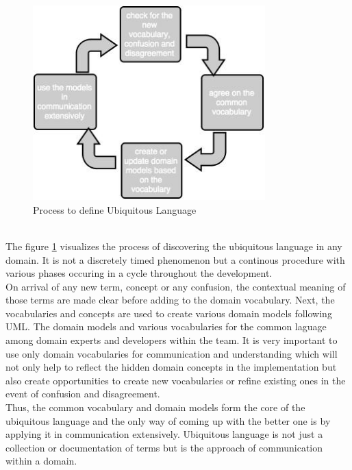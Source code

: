 \begin{figure}[H]
\begin{center}
\includegraphics[width=0.8\textwidth]{figures/domain_driven_design_one}
\caption{Process to define Ubiquitous Language \cite{Evans:2003aa}}
\label{fig:domain_driven_design/ubiquitous_language_process}
\end{center}
\end{figure}
\\
The figure \ref{fig:domain_driven_design/ubiquitous_language_process} visualizes the process of discovering the ubiquitous language in any domain. It is not a discretely timed phenomenon but a continous procedure with various phases occuring in a cycle throughout the development.
\\
On arrival of any new term, concept or any confusion, the contextual meaning of those terms are made clear before adding to the domain vocabulary. Next, the vocabularies and concepts are used to create various domain models following \acrshort{UML}. The domain models and various vocabularies for the common laguage among domain experts and developers within the team. It is very important to use only domain vocabularies for communication and understanding which will not only help to reflect the hidden domain concepts in the implementation but also create opportunities to create new vocabularies or refine existing ones in the event of confusion and disagreement.\cite{Evans:2003aa}
\\
Thus, the common vocabulary and domain models form the core of the ubiquitous language and the only way of coming up with the better one is by applying it in communication extensively. Ubiquitous language is not just a collection or documentation of terms but is the approach of communication within a domain.
\\
